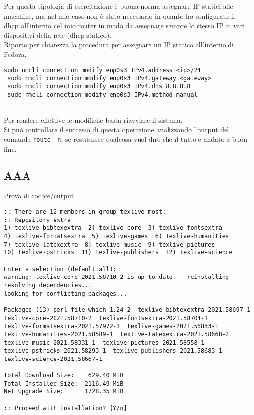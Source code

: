 Per questa tipologia di esercitazione \`{e} buona norma assegnare IP statici alle macchine, ma nel mio caso non \`{e} stato necessario in quanto ho configurato il dhcp all'interno del mio router in modo da assegnare sempre lo stesso IP ai vari dispositivi della rete (dhcp statico).\\ %
Riporto per chiarezza la procedura per assegnare un IP statico all'interno di Fedora.

\begin{lstlisting}[style=cmd]
 sudo nmcli connection modify enp0s3 IPv4.address <ip>/24
 sudo nmcli connection modify enp0s3 IPv4.gateway <gateway>
 sudo nmcli connection modify enp0s3 IPv4.dns 8.8.8.8
 sudo nmcli connection modify enp0s3 IPv4.method manual
\end{lstlisting}
\ \\
Per rendere effettive le modifiche basta riavviare il sistema.\\
Si pu\`{o} controllare il successo di questa operazione analizzando l'output del comando \lstinline[style=cmd]|route -n|, se restituisce qualcosa vuol dire che il tutto \`{e} andato a buon fine.

\subsection{AAA}

Prova di codice/output

\begin{lstlisting}[style=cmd]
:: There are 12 members in group texlive-most:
:: Repository extra
1) texlive-bibtexextra  2) texlive-core  3) texlive-fontsextra
4) texlive-formatsextra  5) texlive-games  6) texlive-humanities
7) texlive-latexextra  8) texlive-music  9) texlive-pictures
10) texlive-pstricks  11) texlive-publishers  12) texlive-science

Enter a selection (default=all): 
warning: texlive-core-2021.58710-2 is up to date -- reinstalling
resolving dependencies...
looking for conflicting packages...

Packages (13) perl-file-which-1.24-2  texlive-bibtexextra-2021.58697-1
texlive-core-2021.58710-2  texlive-fontsextra-2021.58704-1
texlive-formatsextra-2021.57972-1  texlive-games-2021.56833-1
texlive-humanities-2021.58589-1  texlive-latexextra-2021.58668-2
texlive-music-2021.58331-1  texlive-pictures-2021.58558-1
texlive-pstricks-2021.58293-1  texlive-publishers-2021.58683-1
texlive-science-2021.58667-1

Total Download Size:    629.40 MiB
Total Installed Size:  2116.49 MiB
Net Upgrade Size:      1728.35 MiB

:: Proceed with installation? [Y/n] 

\end{lstlisting}

